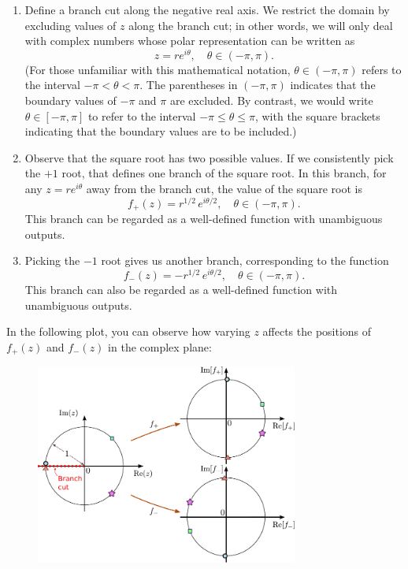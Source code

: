 \documentclass[10pt,a4paper]{article}
\begin{document}
\begin{enumerate}
\item 
Define a branch cut along the negative real axis. We restrict the domain
by excluding values of $z$ along the branch cut; in other words, we
will only deal with complex numbers whose polar representation can be
written as
\begin{equation}
z = r e^{i\theta}, \quad \theta \in (-\pi, \pi).
\end{equation}
(For those unfamiliar with this mathematical notation,
$\theta \in (-\pi, \pi)$ refers to the interval
$-\pi < \theta < \pi$. The parentheses in $(-\pi, \pi)$ indicates
that the boundary values of $-\pi$ and $\pi$ are excluded. By
contrast, we would write $\theta \in [-\pi, \pi]$ to refer to the
interval $-\pi \le \theta \le \pi$, with the square brackets
indicating that the boundary values are to be included.)

\item
  Observe that the square root has two possible values. If we
  consistently pick the $+1$ root, that defines one branch of the
  square root. In this branch, for any $z = re^{i\theta}$ away from
  the branch cut, the value of the square root is
\begin{equation}
f_+(z) = r^{1/2} \, e^{i\theta/2}, \quad \theta \in (-\pi, \pi).
\end{equation}
This branch can be regarded as a well-defined function with unambiguous
outputs.

\item
  Picking the $-1$ root gives us another branch, corresponding to the
function
\begin{equation}
f_-(z) = -r^{1/2} \, e^{i\theta/2}, \quad \theta \in (-\pi, \pi).
\end{equation}
This branch can also be regarded as a well-defined function with
unambiguous outputs.
\end{enumerate}

\noindent
In the following plot, you can observe how varying $z$ affects the
positions of $f_+(z)$ and $f_-(z)$ in the complex plane:

\begin{figure}[h]
  \centering\includegraphics[width=0.77\textwidth]{complex_root_1}
\end{figure}
\end{document}

